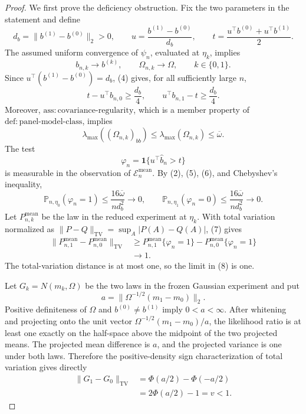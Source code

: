 \documentclass{article}
\begin{document}
\begin{proof}
We first prove the deficiency obstruction. Fix the two parameters in the statement and define
\[
 d_b=\lVert b^{(1)}-b^{(0)}\rVert_2>0,
 \qquad
 u=\frac{b^{(1)}-b^{(0)}}{d_b},
 \qquad
 t=\frac{u^{\top}b^{(0)}+u^{\top}b^{(1)}}2.
 \tag{3}
\]
The assumed uniform convergence of \(\psi_n\), evaluated at \(\eta_k\), implies
\[
 b_{n,k}\longrightarrow b^{(k)},
 \qquad
 \Omega_{n,k}\longrightarrow\Omega,
 \qquad k\in\{0,1\}.
 \tag{4}
\]
Since \(u^{\top}(b^{(1)}-b^{(0)})=d_b\), (4) gives, for all sufficiently large \(n\),
\[
 t-u^{\top}b_{n,0}\geq\frac{d_b}{4},
 \qquad
 u^{\top}b_{n,1}-t\geq\frac{d_b}{4}.
 \tag{5}
\]
Moreover, \(\mathrm{ass:covariance\text{-}regularity}\), which is a member property of \(\mathrm{def:panel\text{-}model\text{-}class}\), implies
\[
 \lambda_{\max}((\Omega_{n,k})_{bb})
 \leq\lambda_{\max}(\Omega_{n,k})
 \leq\overline\omega.
 \tag{6}
\]
The test
\[
 \varphi_n=\mathbf 1\{u^{\top}\widehat b_n>t\}
\]
is measurable in the observation of \(\mathcal E_n^{\mathrm{mean}}\). By (2), (5), (6), and Chebyshev's inequality,
\[
 \mathbb P_{n,\eta_0}(\varphi_n=1)
 \leq\frac{16\overline\omega}{n d_b^2}\longrightarrow0,
 \qquad
 \mathbb P_{n,\eta_1}(\varphi_n=0)
 \leq\frac{16\overline\omega}{n d_b^2}\longrightarrow0.
 \tag{7}
\]
Let \(P^{\mathrm{mean}}_{n,k}\) be the law in the reduced experiment at \(\eta_k\). With total variation normalized as \(\lVert P-Q\rVert_{\mathrm{TV}}=\sup_A|P(A)-Q(A)|\), (7) gives
\[
 \begin{aligned}
 \lVert P^{\mathrm{mean}}_{n,1}-P^{\mathrm{mean}}_{n,0}\rVert_{\mathrm{TV}}
 &\geq
 P^{\mathrm{mean}}_{n,1}\{\varphi_n=1\}
 -P^{\mathrm{mean}}_{n,0}\{\varphi_n=1\}\\
 &\longrightarrow1.
 \end{aligned}
 \tag{8}
\]
The total-variation distance is at most one, so the limit in (8) is one.

Let \(G_k=N(m_k,\Omega)\) be the two laws in the frozen Gaussian experiment and put
\[
 a=\lVert\Omega^{-1/2}(m_1-m_0)\rVert_2.
\]
Positive definiteness of \(\Omega\) and \(b^{(0)}\ne b^{(1)}\) imply \(0<a<\infty\). After whitening and projecting onto the unit vector \(\Omega^{-1/2}(m_1-m_0)/a\), the likelihood ratio is at least one exactly on the half-space above the midpoint of the two projected means. The projected mean difference is \(a\), and the projected variance is one under both laws. Therefore the positive-density sign characterization of total variation gives directly
\[
 \begin{aligned}
 \lVert G_1-G_0\rVert_{\mathrm{TV}}
 &=\Phi(a/2)-\Phi(-a/2)\\
 &=2\Phi(a/2)-1
 =v<1.
 \end{aligned}
 \tag{9}
\]


\end{proof}
\end{document}
